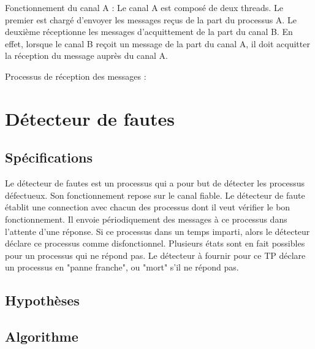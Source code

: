 \documentclass[a4paper, 10pt, french]{article}
\begin{document}
Fonctionnement du canal A :
Le canal A est composé de deux threads. Le premier est chargé d'envoyer les messages reçus de la part du processus A. Le deuxième réceptionne les messages d'acquittement de la part du canal B. En effet, lorsque le canal B reçoit un message de la part du canal A, il doit acquitter la réception du message auprès du canal A.

Processus de réception des messages : 

\section{Détecteur de fautes}
\subsection{Spécifications}
Le détecteur de fautes est un processus qui a pour but de détecter les processus défectueux. Son fonctionnement repose sur le canal fiable. \newline
Le détecteur de faute établit une connection avec chacun des processus dont il veut vérifier le bon fonctionnement. Il envoie périodiquement des messages à ce processus dans l'attente d'une réponse. Si ce processus dans un temps imparti, alors le détecteur déclare ce processus comme disfonctionnel. \newline
Plusieurs états sont en fait possibles pour un processus qui ne répond pas. Le détecteur à fournir pour ce TP déclare un processus en "panne franche", ou "mort" s'il ne répond pas.

\subsection{Hypothèses}

\subsection{Algorithme}
\end{document}
